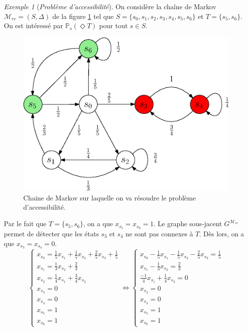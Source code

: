 \documentclass[12pt,a4paper]{report}
\theoremstyle{definition}%
\theoremstyle{remark}
\newtheorem{example}{Exemple}[chapter]
\begin{document}
\begin{example}[\textit{Problème d'accessibilité}]\label{reachex}
	On considère la chaîne de Markov $\mathcal{M}_{re} = (S, \Delta)$ de la figure \ref{reachability-example} tel que $S = \{s_0, s_1, s_2, s_3, s_4, s_5, s_6\}$ et  $T = \{ s_5, s_6 \}$. On est intéressé par $\mathbb{P}_s(\Diamond T)$ pour tout $s \in S$.
	\begin{figure}[H]
	\centering
	\includegraphics[scale=0.7]{figures/reachability-example.eps}
	\caption{Chaine de Markov sur laquelle on va résoudre le problème d'accessibilité.}
	\label{reachability-example}
	\end{figure}

Par le fait que $T = \{s_5, s_6\}$, on a que $x_{s_5} = x_{s_6} = 1$. Le graphe sous-jacent $G^{\mathcal{M}_{re}}$ permet de détecter que %
les états $s_3$ et $s_4$ ne sont pas connexes à $T$. Dès lors, on a que $x_{s_3} = x_{s_4} = 0$.
\[
\begin{cases}
x_{s_0} = \frac{1}{5} x_{s_1} + \frac{1}{5} x_{s_2} + \frac{2}{5} x_{s_3} + \frac{1}{5} \\
x_{s_1} = \frac{1}{3} x_{s_2} + \frac{2}{3} \\
x_{s_2} = \frac{1}{4} x_{s_1} + \frac{3}{4} x_{s_2} \\
x_{s_3} = 0 \\
x_{s_4} = 0 \\
x_{s_5} = 1 \\
x_{s_6} = 1
\end{cases}
\iff
\begin{cases}
x_{s_0} - \frac{1}{5} x_{s_1} - \frac{1}{5} x_{s_2} - \frac{2}{5} x_{s_3} = \frac{1}{5} \\
x_{s_1} - \frac{1}{3} x_{s_2} = \frac{2}{3} \\
\frac{-1}{4} x_{s_1} + \frac{1}{4} x_{s_2} = 0 \\
x_{s_3} = 0 \\
x_{s_4} = 0 \\
x_{s_5} = 1 \\
x_{s_6} = 1 
\end{cases}
\]


\end{example}
\end{document}
